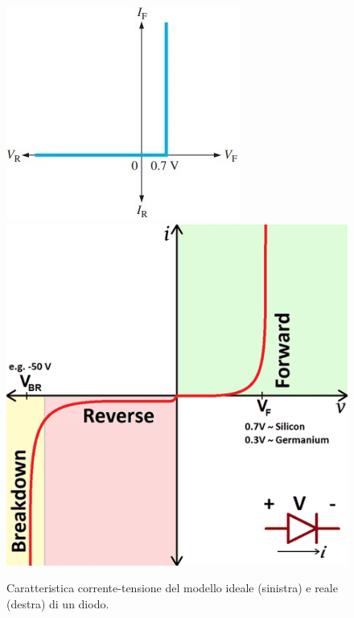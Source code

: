 \begin{figure}[tbh]
	\centering
	\includegraphics[width=0.3\linewidth]{./ImageFiles/Laboratorio 2/diodo_2}
	\includegraphics[width=0.3\linewidth]{./ImageFiles/Laboratorio 2/diodo_3}
	\caption{Caratteristica corrente-tensione del modello ideale (sinistra) e reale (destra) di un diodo.}
	\label{fig:diodo_caratteristica}
\end{figure}

